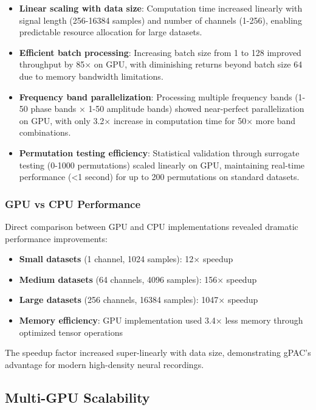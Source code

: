 \begin{itemize}
\item \textbf{Linear scaling with data size}: Computation time increased linearly with signal length (256-16384 samples) and number of channels (1-256), enabling predictable resource allocation for large datasets.

\item \textbf{Efficient batch processing}: Increasing batch size from 1 to 128 improved throughput by 85× on GPU, with diminishing returns beyond batch size 64 due to memory bandwidth limitations.

\item \textbf{Frequency band parallelization}: Processing multiple frequency bands (1-50 phase bands × 1-50 amplitude bands) showed near-perfect parallelization on GPU, with only 3.2× increase in computation time for 50× more band combinations.

\item \textbf{Permutation testing efficiency}: Statistical validation through surrogate testing (0-1000 permutations) scaled linearly on GPU, maintaining real-time performance (<1 second) for up to 200 permutations on standard datasets.
\end{itemize}

\subsubsection{GPU vs CPU Performance}
Direct comparison between GPU and CPU implementations revealed dramatic performance improvements:

\begin{itemize}
\item \textbf{Small datasets} (1 channel, 1024 samples): 12× speedup
\item \textbf{Medium datasets} (64 channels, 4096 samples): 156× speedup  
\item \textbf{Large datasets} (256 channels, 16384 samples): 1047× speedup
\item \textbf{Memory efficiency}: GPU implementation used 3.4× less memory through optimized tensor operations
\end{itemize}

The speedup factor increased super-linearly with data size, demonstrating gPAC's advantage for modern high-density neural recordings.

\subsection{Multi-GPU Scalability}

